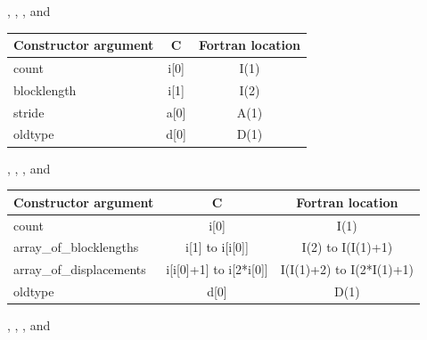 \begin{description}[style=unboxed,leftmargin=0cm]
\item[\mpiconstmain{MPI\_COMBINER\_HVECTOR}]
, , , and

\begin{center}
\begin{tabular}{l c c}
\hline
Constructor argument &  C &    Fortran location                \\
\hline
count &                 i[0] &          I(1)                            \\
blocklength &           i[1] &          I(2)                            \\
stride &                a[0] &          A(1)                            \\
oldtype &               d[0] &          D(1)                            \\
\hline
\end{tabular}
\end{center}

\item[\mpiconstmain{MPI\_COMBINER\_INDEXED}]
, , , and

\begin{center}
\begin{tabular}{l c c}
\hline
Constructor argument &          C &                    Fortran location                \\
\hline
count                   &       i[0] &                          I(1)                            \\
array\_of\_blocklengths &       i[1] to i[i[0]] &               I(2) to I(I(1)+1)               \\
array\_of\_displacements &      i[i[0]+1] to i[2*i[0]] &        I(I(1)+2) to I(2*I(1)+1)        \\
oldtype &                       d[0] &                          D(1)                            \\
\hline
\end{tabular}
\end{center}

\item[\mpiconstmain{MPI\_COMBINER\_HINDEXED}]
, , , and


\end{description}
